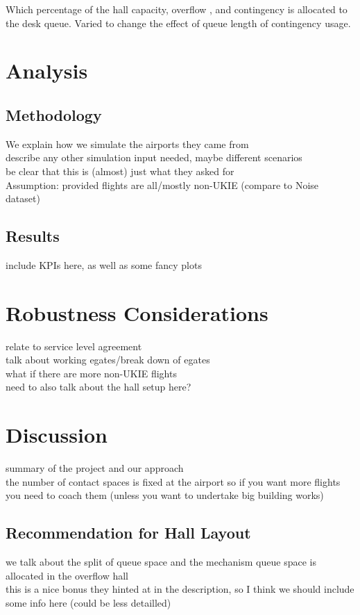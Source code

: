\documentclass[10pt]{article}
\begin{document}
Which percentage of the hall capacity, overflow , and contingency is allocated to the desk queue. Varied to change the effect of queue length of contingency usage.



\section{Analysis}

\subsection{Methodology}
We explain how we simulate the airports they came from \\
describe any other simulation input needed, maybe different scenarios \\ 
be clear that this is (almost) just what they asked for  \\ Assumption: provided flights are all/mostly non-UKIE (compare to Noise dataset)



\subsection{Results}
include KPIs here, as well as some fancy plots



\section{Robustness Considerations}
relate to service level agreement \\
talk about working \glspl{egate}/break down of \glspl{egate}  \\
what if there are more non-UKIE flights  \\ 
need to also talk about the hall setup here?



\section{Discussion}
summary of the project and our approach \\
the number of contact spaces is fixed at the airport so if you want more flights you need to coach them (unless you want to undertake big building works) 

\subsection{Recommendation for Hall Layout}
we talk about the split of queue space and the mechanism queue space is allocated in the overflow hall \\
this is a nice bonus they hinted at in the description, so I think we should include some info here (could be less detailled)
\end{document}

